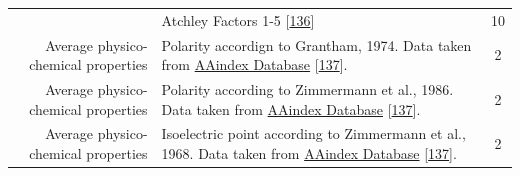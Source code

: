 \documentclass[12pt,a4paper,twoside]{book}
\theoremstyle{definition}
\theoremstyle{definition}
\theoremstyle{remark}
\begin{document}
\begin{longtable}[]{@{}rlc@{}}
\begin{minipage}[t]{0.23\columnwidth}
\end{minipage} & \begin{minipage}[t]{0.50\columnwidth}\raggedright\strut
Atchley Factors 1-5 {[}\protect\hyperlink{ref-Atchley2005}{136}{]}\strut
\end{minipage} & \begin{minipage}[t]{0.18\columnwidth}\centering\strut
10\strut
\end{minipage}\tabularnewline
\begin{minipage}[t]{0.23\columnwidth}\raggedleft\strut
Average physico-chemical properties\strut
\end{minipage} & \begin{minipage}[t]{0.50\columnwidth}\raggedright\strut
Polarity accordign to Grantham, 1974. Data taken from
\href{http://www.genome.jp/dbget-bin/www_bget?aaindex:GRAR740102}{AAindex
Database} {[}\protect\hyperlink{ref-Kawashima2008}{137}{]}.\strut
\end{minipage} & \begin{minipage}[t]{0.18\columnwidth}\centering\strut
2\strut
\end{minipage}\tabularnewline
\begin{minipage}[t]{0.23\columnwidth}\raggedleft\strut
Average physico-chemical properties\strut
\end{minipage} & \begin{minipage}[t]{0.50\columnwidth}\raggedright\strut
Polarity according to Zimmermann et al., 1986. Data taken from
\href{http://www.genome.jp/dbget-bin/www_bget?aaindex:ZIMJ680103}{AAindex
Database} {[}\protect\hyperlink{ref-Kawashima2008}{137}{]}.\strut
\end{minipage} & \begin{minipage}[t]{0.18\columnwidth}\centering\strut
2\strut
\end{minipage}\tabularnewline
\begin{minipage}[t]{0.23\columnwidth}\raggedleft\strut
Average physico-chemical properties\strut
\end{minipage} & \begin{minipage}[t]{0.50\columnwidth}\raggedright\strut
Isoelectric point according to Zimmermann et al., 1968. Data taken from
\href{http://www.genome.jp/dbget-bin/www_bget?aaindex:ZIMJ680104}{AAindex
Database} {[}\protect\hyperlink{ref-Kawashima2008}{137}{]}.\strut
\end{minipage} & \begin{minipage}[t]{0.18\columnwidth}\centering\strut
2\strut
\end{minipage}\tabularnewline

\end{longtable}
\end{document}
